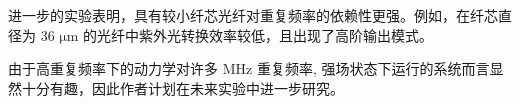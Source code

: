 \documentclass[14pt,a4paper,oneside]{article}
\begin{document}
进一步的实验表明，具有较小纤芯光纤对重复频率的依赖性更强。例如，在纤芯直径为 36 $\mathrm{\mu m}$ 的光纤中紫外光转换效率较低，且出现了高阶输出模式。

由于高重复频率下的动力学对许多 MHz 重复频率, 强场状态下运行的系统而言显然十分有趣，因此作者计划在未来实验中进一步研究。




\newpage

\clearpage           %
{}      %
{}   %


\end{document}
